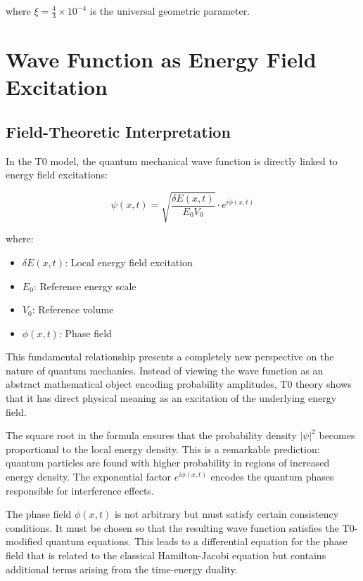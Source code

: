 \documentclass[12pt,a4paper]{article}
\newcommand{\deltaE}{\delta E}
\newcommand{\xipar}{\xi}
\theoremstyle{definition}
\theoremstyle{remark}
\begin{document}
	where $\xipar = \frac{4}{3} \times 10^{-4}$ is the universal geometric parameter.
	
	\section{Wave Function as Energy Field Excitation}
	
	\subsection{Field-Theoretic Interpretation}
	
	In the T0 model, the quantum mechanical wave function is directly linked to energy field excitations:
	
	\begin{equation}
		\boxed{\psi(x,t) = \sqrt{\frac{\deltaE(x,t)}{E_0 V_0}} \cdot e^{i\phi(x,t)}}
		\label{eq:wavefunction_field}
	\end{equation}
	
	where:
	\begin{itemize}
		\item $\deltaE(x,t)$: Local energy field excitation
		\item $E_0$: Reference energy scale
		\item $V_0$: Reference volume
		\item $\phi(x,t)$: Phase field
	\end{itemize}
	
	This fundamental relationship presents a completely new perspective on the nature of quantum mechanics. Instead of viewing the wave function as an abstract mathematical object encoding probability amplitudes, T0 theory shows that it has direct physical meaning as an excitation of the underlying energy field.
	
	The square root in the formula ensures that the probability density $|\psi|^2$ becomes proportional to the local energy density. This is a remarkable prediction: quantum particles are found with higher probability in regions of increased energy density. The exponential factor $e^{i\phi(x,t)}$ encodes the quantum phases responsible for interference effects.
	
	The phase field $\phi(x,t)$ is not arbitrary but must satisfy certain consistency conditions. It must be chosen so that the resulting wave function satisfies the T0-modified quantum equations. This leads to a differential equation for the phase field that is related to the classical Hamilton-Jacobi equation but contains additional terms arising from the time-energy duality.
	
\end{document}
